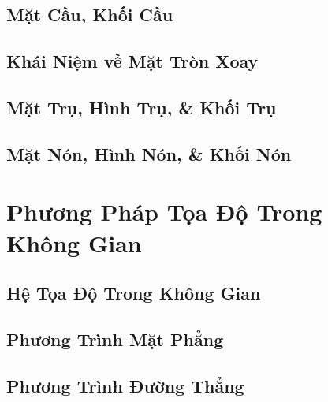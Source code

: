 \documentclass[oneside]{book}
\numberwithin{equation}{section}
\begin{document}
\section{Mặt Cầu, Khối Cầu}


\section{Khái Niệm về Mặt Tròn Xoay}


\section{Mặt Trụ, Hình Trụ, \& Khối Trụ}


\section{Mặt Nón, Hình Nón, \& Khối Nón}


\chapter{Phương Pháp Tọa Độ Trong Không Gian}

\section{Hệ Tọa Độ Trong Không Gian}


\section{Phương Trình Mặt Phẳng}


\section{Phương Trình Đường Thẳng}


\printbibliography[heading=bibintoc]
	
\end{document}
